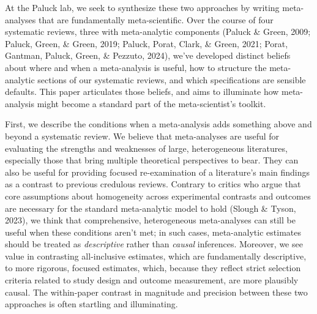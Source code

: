 \documentclass[
  man]{apa6}
\begin{document}
At the Paluck lab, we seek to synthesize these two approaches by writing meta-analyses that are fundamentally meta-scientific. Over the course of four systematic reviews, three with meta-analytic components (Paluck \& Green, 2009; Paluck, Green, \& Green, 2019; Paluck, Porat, Clark, \& Green, 2021; Porat, Gantman, Paluck, Green, \& Pezzuto, 2024), we've developed distinct beliefs about where and when a meta-analysis is useful, how to structure the meta-analytic sections of our systematic reviews, and which specifications are sensible defaults. This paper articulates those beliefs, and aims to illuminate how meta-analysis might become a standard part of the meta-scientist's toolkit.

First, we describe the conditions when a meta-analysis adds something above and beyond a systematic review. We believe that meta-analyses are useful for evaluating the strengths and weaknesses of large, heterogeneous literatures, especially those that bring multiple theoretical perspectives to bear. They can also be useful for providing focused re-examination of a literature's main findings as a contrast to previous credulous reviews. Contrary to critics who argue that core assumptions about homogeneity across experimental contrasts and outcomes are necessary for the standard meta-analytic model to hold (Slough \& Tyson, 2023), we think that comprehensive, heterogeneous meta-analyses can still be useful when these conditions aren't met; in such cases, meta-analytic estimates should be treated as \emph{descriptive} rather than \emph{causal} inferences. Moreover, we see value in contrasting all-inclusive estimates, which are fundamentally descriptive, to more rigorous, focused estimates, which, because they reflect strict selection criteria related to study design and outcome measurement, are more plausibly causal. The within-paper contrast in magnitude and precision between these two approaches is often startling and illuminating.
\end{document}
